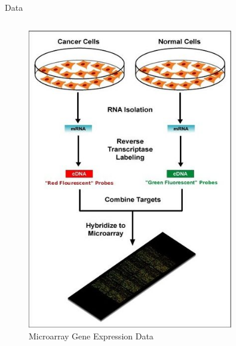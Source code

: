 \documentclass[final]{beamer} %
\newcommand{\source}[1]{\begin{textblock*}{4cm}(8.7cm,8.6cm)
    \begin{beamercolorbox}[ht=0.5cm,right]{framesource}
        \usebeamerfont{framesource}\usebeamercolor[fg]{framesource} {#1}
    \end{beamercolorbox}
\end{textblock*}}
\begin{document}
\begin{frame}{}
\begin{block}{Data}
\begin{columns}[T]
\begin{column}{0.3\textwidth}
\begin{columns}
\begin{column}{0.5\textwidth}
\begin{figure}
              \includegraphics[width=0.8\textwidth]{Microarray-schema}
              \caption{\tiny Microarray Gene Expression Data}
            \end{figure}
          \end{column}
        \end{columns}
      \end{column}


\end{columns}
\end{block}
\end{frame}
\end{document}
